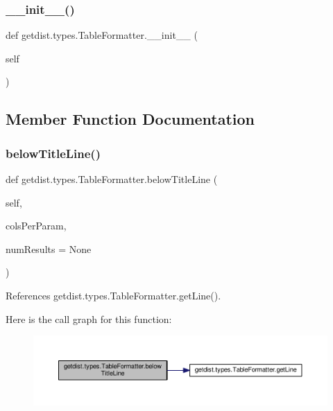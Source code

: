 \subsubsection{\texorpdfstring{\+\_\+\+\_\+init\+\_\+\+\_\+()}{\_\_init\_\_()}}
{\footnotesize\ttfamily def getdist.\+types.\+Table\+Formatter.\+\_\+\+\_\+init\+\_\+\+\_\+ (\begin{DoxyParamCaption}\item[{}]{self }\end{DoxyParamCaption})}



\subsection{Member Function Documentation}
\mbox{\label{classgetdist_1_1types_1_1TableFormatter_afa1c1cab3c500367198430e6a9c01c9e}} 
\subsubsection{\texorpdfstring{below\+Title\+Line()}{belowTitleLine()}}
{\footnotesize\ttfamily def getdist.\+types.\+Table\+Formatter.\+below\+Title\+Line (\begin{DoxyParamCaption}\item[{}]{self,  }\item[{}]{cols\+Per\+Param,  }\item[{}]{num\+Results = {\ttfamily None} }\end{DoxyParamCaption})}



References getdist.\+types.\+Table\+Formatter.\+get\+Line().

Here is the call graph for this function\+:
\nopagebreak
\begin{figure}[H]
\begin{center}
\leavevmode
\includegraphics[width=350pt]{classgetdist_1_1types_1_1TableFormatter_afa1c1cab3c500367198430e6a9c01c9e_cgraph}
\end{center}
\end{figure}
\mbox{\label{classgetdist_1_1types_1_1TableFormatter_a7ef55084ae5cda665dc9b6801fcfe352}} 
